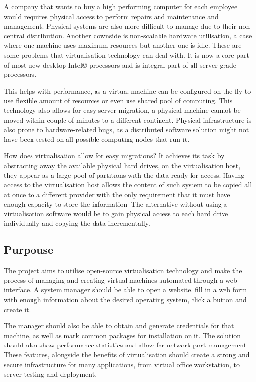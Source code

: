 \documentclass{article}
\begin{document}
  A company that wants to buy a high performing computer for each employee would requires physical access to perform repairs and maintenance and management. Physical systems are also more difficult to manage due to their non-central distribution. Another downside is non-scalable hardware utilisation, a case where one machine uses maximum resources but another one is idle. These are some problems that virtualisation technology can deal with.  It is now a core part of most new desktop Intel© processors and is integral part of all server-grade processors.
  
  This helps with performance, as a virtual machine can be configured on the fly to use flexible amount of resources or even use shared pool of computing. This technology also allows for easy server migration, a physical machine cannot be moved within couple of minutes to a different continent. Physical infrastructure is also prone to hardware-related bugs, as a distributed software solution might not have been tested on all possible computing nodes that run it.
  
  How does virtualisation allow for easy migrations? It achieves its task by abstracting away the available physical hard drives, on the virtualisation host, they appear as a large pool of partitions with the data ready for access. Having access to the virtualisation host allows the content of such system to be copied all at once to a different provider with the only requirement that it must have enough capacity to store the information. The alternative without using a virtualisation software would be to gain physical access to each hard drive individually and copying the data incrementally.
  
  \subsection{Purpouse}
   The project aims to utilise open-source virtualisation technology and make the process of managing and creating virtual machines automated through a web interface. A system manager should be able to open a website, fill in a web form with enough information about the desired operating system, click a button and create it. 
   
   The manager should also be able to obtain and generate credentials for that machine, as well as mark common packages for installation on it. The solution should also show performance statistics and allow for network port management. These features, alongside the benefits of virtualisation should create a strong and secure infrastructure for many applications, from virtual office workstation, to server testing and deployment.
   
\end{document}
